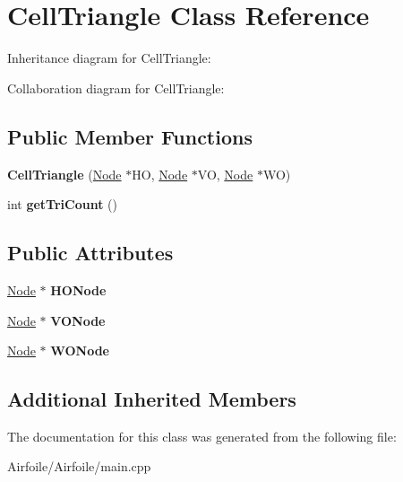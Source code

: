 \hypertarget{class_cell_triangle}{}\section{Cell\+Triangle Class Reference}
\label{class_cell_triangle}


Inheritance diagram for Cell\+Triangle\+:


Collaboration diagram for Cell\+Triangle\+:
\subsection*{Public Member Functions}
\begin{DoxyCompactItemize}
\item 
\mbox{\label{class_cell_triangle_a92f169c9240058bf864e1c9d76ed099e}} 
{\bfseries Cell\+Triangle} (\mbox{\hyperlink{class_node}{Node}} $\ast$HO, \mbox{\hyperlink{class_node}{Node}} $\ast$VO, \mbox{\hyperlink{class_node}{Node}} $\ast$WO)
\item 
\mbox{\label{class_cell_triangle_aa01816399c78daa456be787857a363c6}} 
int {\bfseries get\+Tri\+Count} ()
\end{DoxyCompactItemize}
\subsection*{Public Attributes}
\begin{DoxyCompactItemize}
\item 
\mbox{\label{class_cell_triangle_adbf78fc19e22a736393a45e39a7d56ff}} 
\mbox{\hyperlink{class_node}{Node}} $\ast$ {\bfseries H\+O\+Node}
\item 
\mbox{\label{class_cell_triangle_a21659a5d367cacd2494541a8992165f4}} 
\mbox{\hyperlink{class_node}{Node}} $\ast$ {\bfseries V\+O\+Node}
\item 
\mbox{\label{class_cell_triangle_a59cc3e83afb639d0928ff16d8ae2734d}} 
\mbox{\hyperlink{class_node}{Node}} $\ast$ {\bfseries W\+O\+Node}
\end{DoxyCompactItemize}
\subsection*{Additional Inherited Members}


The documentation for this class was generated from the following file\+:\begin{DoxyCompactItemize}
\item 
Airfoile/\+Airfoile/main.\+cpp\end{DoxyCompactItemize}
